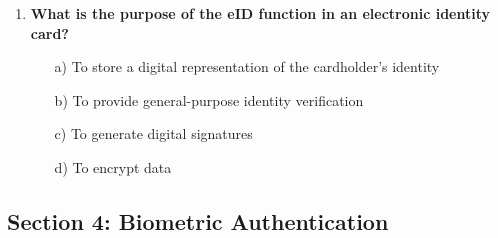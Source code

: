 \documentclass{article}
\begin{document}
\begin{enumerate}
    \item \textbf{What is the purpose of the eID function in an electronic identity card?}
    \begin{itemize}
        \item[a)] To store a digital representation of the cardholder’s identity  
        \item[b)] To provide general-purpose identity verification  
        \item[c)] To generate digital signatures  
        \item[d)] To encrypt data  
    \end{itemize}
\end{enumerate}

\subsection*{Section 4: Biometric Authentication}
\end{document}
